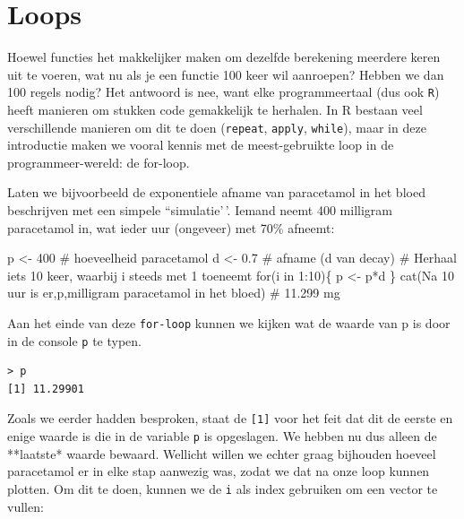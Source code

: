 \documentclass[
  a4paper,
]{scrbook}
\newenvironment{Shaded}{\begin{snugshade}}{\end{snugshade}}
\newcommand{\CommentTok}[1]{\textcolor[rgb]{0.37,0.37,0.37}{#1}}
\newcommand{\ControlFlowTok}[1]{\textcolor[rgb]{0.00,0.23,0.31}{#1}}
\newcommand{\DecValTok}[1]{\textcolor[rgb]{0.68,0.00,0.00}{#1}}
\newcommand{\FloatTok}[1]{\textcolor[rgb]{0.68,0.00,0.00}{#1}}
\newcommand{\FunctionTok}[1]{\textcolor[rgb]{0.28,0.35,0.67}{#1}}
\newcommand{\NormalTok}[1]{\textcolor[rgb]{0.00,0.23,0.31}{#1}}
\newcommand{\OtherTok}[1]{\textcolor[rgb]{0.00,0.23,0.31}{#1}}
\newcommand{\SpecialCharTok}[1]{\textcolor[rgb]{0.37,0.37,0.37}{#1}}
\newcommand{\StringTok}[1]{\textcolor[rgb]{0.13,0.47,0.30}{#1}}
\theoremstyle{definition}
\theoremstyle{remark}
\begin{document}
\hypertarget{loops}{%
\section{Loops}\label{loops}}

Hoewel functies het makkelijker maken om dezelfde berekening meerdere
keren uit te voeren, wat nu als je een functie 100 keer wil aanroepen?
Hebben we dan 100 regels nodig? Het antwoord is nee, want elke
programmeertaal (dus ook \texttt{R}) heeft manieren om stukken code
gemakkelijk te herhalen. In R bestaan veel verschillende manieren om dit
te doen (\texttt{repeat}, \texttt{apply}, \texttt{while}), maar in deze
introductie maken we vooral kennis met de meest-gebruikte loop in de
programmeer-wereld: de for-loop.

Laten we bijvoorbeeld de exponentiele afname van paracetamol in het
bloed beschrijven met een simpele ``simulatie'\,'. Iemand neemt 400
milligram paracetamol in, wat ieder uur (ongeveer) met 70\% afneemt:

\begin{Shaded}
\begin{Highlighting}[]
\NormalTok{p }\OtherTok{\textless{}{-}} \DecValTok{400} \CommentTok{\# hoeveelheid paracetamol}
\NormalTok{d }\OtherTok{\textless{}{-}} \FloatTok{0.7} \CommentTok{\# afname (d van decay)}
\CommentTok{\# Herhaal iets 10 keer, waarbij \textquotesingle{}i\textquotesingle{} steeds met 1 toeneemt}
\ControlFlowTok{for}\NormalTok{(i }\ControlFlowTok{in} \DecValTok{1}\SpecialCharTok{:}\DecValTok{10}\NormalTok{)\{}
\NormalTok{  p }\OtherTok{\textless{}{-}}\NormalTok{ p}\SpecialCharTok{*}\NormalTok{d}
\NormalTok{\}}
\FunctionTok{cat}\NormalTok{(}\StringTok{\textquotesingle{}Na 10 uur is er\textquotesingle{}}\NormalTok{,p,}\StringTok{\textquotesingle{}milligram paracetamol in het bloed\textquotesingle{}}\NormalTok{) }\CommentTok{\# 11.299 mg}
\end{Highlighting}
\end{Shaded}

Aan het einde van deze \texttt{for-loop} kunnen we kijken wat de waarde
van p is door in de console \texttt{p} te typen.

\begin{verbatim}
> p
[1] 11.29901
\end{verbatim}

Zoals we eerder hadden besproken, staat de \texttt{{[}1{]}} voor het
feit dat dit de eerste en enige waarde is die in de variable \texttt{p}
is opgeslagen. We hebben nu dus alleen de **laatste* waarde bewaard.
Wellicht willen we echter graag bijhouden hoeveel paracetamol er in elke
stap aanwezig was, zodat we dat na onze loop kunnen plotten. Om dit te
doen, kunnen we de \texttt{i} als index gebruiken om een vector te
vullen:
\end{document}
